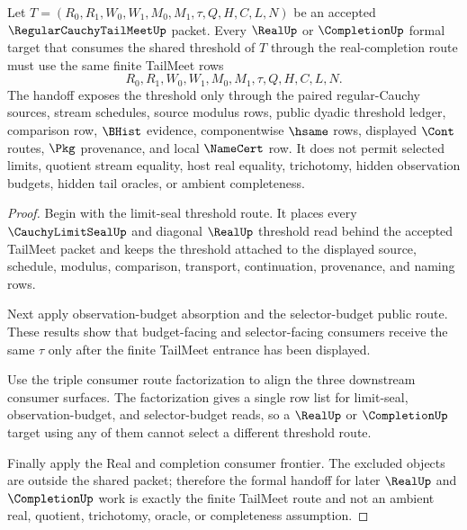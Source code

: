 \begin{theorem}
\label{thm:regular-cauchy-tail-meet-real-completion-formal-frontier}
Let $T=(R_0,R_1,W_0,W_1,M_0,M_1,\tau,Q,H,C,L,N)$ be an accepted $\RegularCauchyTailMeetUp$ packet. Every $\RealUp$ or $\CompletionUp$ formal target that consumes the shared threshold of $T$ through the real-completion route must use the same finite TailMeet rows
$$
R_0,R_1,W_0,W_1,M_0,M_1,\tau,Q,H,C,L,N.
$$
The handoff exposes the threshold only through the paired regular-Cauchy sources, stream schedules, source modulus rows, public dyadic threshold ledger, comparison row, $\BHist$ evidence, componentwise $\hsame$ rows, displayed $\Cont$ routes, $\Pkg$ provenance, and local $\NameCert$ row. It does not permit selected limits, quotient stream equality, host real equality, trichotomy, hidden observation budgets, hidden tail oracles, or ambient completeness.
\end{theorem}
\begin{proof}
Begin with the limit-seal threshold route. It places every $\CauchyLimitSealUp$ and diagonal $\RealUp$ threshold read behind the accepted TailMeet packet and keeps the threshold attached to the displayed source, schedule, modulus, comparison, transport, continuation, provenance, and naming rows.

Next apply observation-budget absorption and the selector-budget public route. These results show that budget-facing and selector-facing consumers receive the same $\tau$ only after the finite TailMeet entrance has been displayed.

Use the triple consumer route factorization to align the three downstream consumer surfaces. The factorization gives a single row list for limit-seal, observation-budget, and selector-budget reads, so a $\RealUp$ or $\CompletionUp$ target using any of them cannot select a different threshold route.

Finally apply the Real and completion consumer frontier. The excluded objects are outside the shared packet; therefore the formal handoff for later $\RealUp$ and $\CompletionUp$ work is exactly the finite TailMeet route and not an ambient real, quotient, trichotomy, oracle, or completeness assumption.
\end{proof}

